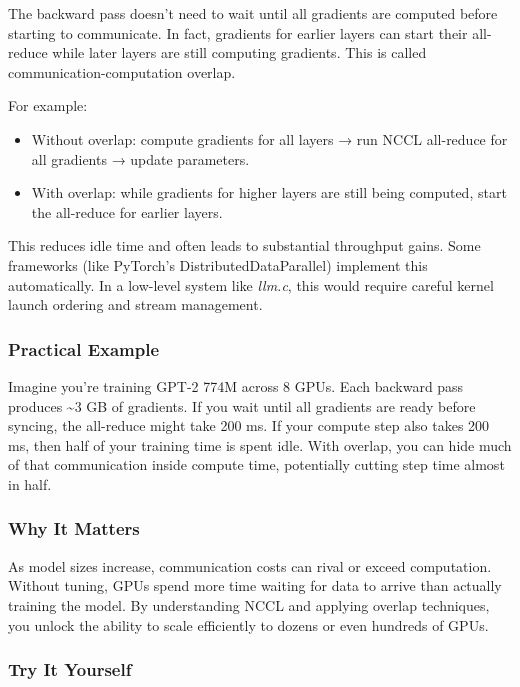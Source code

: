 \documentclass[
  letterpaper,
  DIV=11,
  numbers=noendperiod]{scrreprt}
\providecommand{\tightlist}{%
  \setlength{\itemsep}{0pt}\setlength{\parskip}{0pt}}
\begin{document}
The backward pass doesn't need to wait until all gradients are computed
before starting to communicate. In fact, gradients for earlier layers
can start their all-reduce while later layers are still computing
gradients. This is called communication-computation overlap.

For example:

\begin{itemize}
\tightlist
\item
  Without overlap: compute gradients for all layers → run NCCL
  all-reduce for all gradients → update parameters.
\item
  With overlap: while gradients for higher layers are still being
  computed, start the all-reduce for earlier layers.
\end{itemize}

This reduces idle time and often leads to substantial throughput gains.
Some frameworks (like PyTorch's DistributedDataParallel) implement this
automatically. In a low-level system like \emph{llm.c}, this would
require careful kernel launch ordering and stream management.

\subsubsection{Practical Example}\label{practical-example}

Imagine you're training GPT-2 774M across 8 GPUs. Each backward pass
produces \textasciitilde3 GB of gradients. If you wait until all
gradients are ready before syncing, the all-reduce might take 200 ms. If
your compute step also takes 200 ms, then half of your training time is
spent idle. With overlap, you can hide much of that communication inside
compute time, potentially cutting step time almost in half.

\subsubsection{Why It Matters}\label{why-it-matters-53}

As model sizes increase, communication costs can rival or exceed
computation. Without tuning, GPUs spend more time waiting for data to
arrive than actually training the model. By understanding NCCL and
applying overlap techniques, you unlock the ability to scale efficiently
to dozens or even hundreds of GPUs.

\subsubsection{Try It Yourself}\label{try-it-yourself-67}
\end{document}
